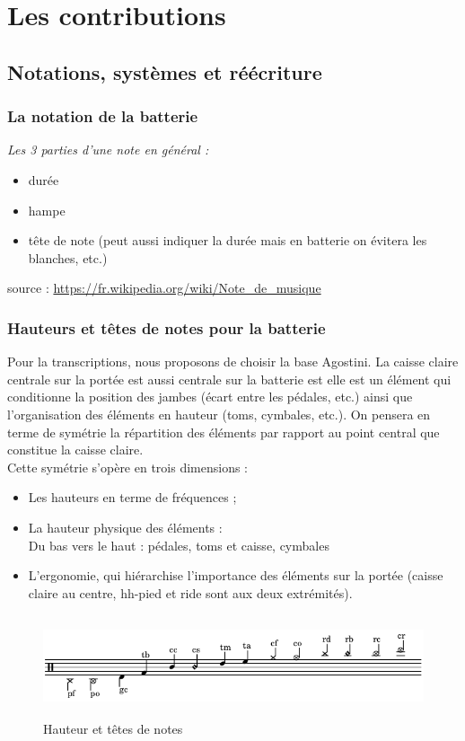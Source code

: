 \section{Les contributions}
\subsection{Notations, systèmes et réécriture}
\subsubsection{La notation de la batterie}
\textit{Les 3 parties d’une note en général :}
\begin{itemize}
	\item durée
	\item hampe
	\item tête de note (peut aussi indiquer la durée mais en batterie on évitera les blanches, etc.)
\end{itemize}
source : \url{https://fr.wikipedia.org/wiki/Note_de_musique}

\subsubsection{Hauteurs et têtes de notes pour la batterie}
Pour la transcriptions, nous proposons de choisir la base Agostini. La caisse claire centrale sur la portée est aussi centrale sur la batterie est elle est un élément qui conditionne la position des jambes (écart entre les pédales, etc.) ainsi que l’organisation des éléments en hauteur (toms, cymbales, etc.).
On pensera en terme de symétrie la répartition des éléments par rapport au point central que constitue la caisse claire.\\
Cette symétrie s’opère en trois dimensions :
\begin{itemize}
	\item Les hauteurs en terme de fréquences ;
	\item La hauteur physique des éléments :\\
	Du bas vers le haut : pédales, toms et caisse, cymbales
	\item L’ergonomie, qui hiérarchise l’importance des éléments sur la portée (caisse claire au centre, hh-pied et ride sont aux deux extrémités).
\end{itemize}
\begin{figure}[h]
	\includegraphics[height=30mm, width=155mm]{z_images/1_description_notation/notes.png}
	\caption{Hauteur et têtes de notes}
\end{figure}
